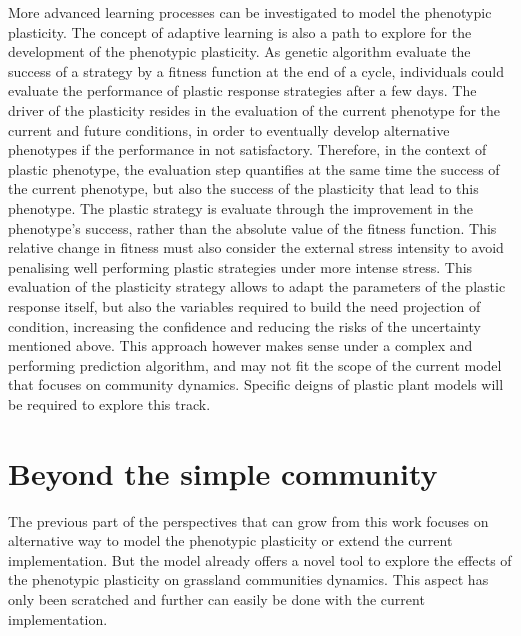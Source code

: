 More advanced learning processes can be investigated to model the phenotypic plasticity. The concept of adaptive learning is also a path to explore for the development of the phenotypic plasticity. As genetic algorithm evaluate the success of a strategy by a fitness function at the end of a cycle, individuals could evaluate the performance of plastic response strategies after a few days. The driver of the plasticity resides in the evaluation of the current phenotype for the current and future conditions, in order to eventually develop alternative phenotypes if the performance in not satisfactory. Therefore, in the context of plastic phenotype, the evaluation step quantifies at the same time the success of the current phenotype, but also the success of the plasticity that lead to this phenotype. The plastic strategy is evaluate through the improvement in the phenotype's success, rather than the absolute value of the fitness function. This relative change in fitness must also consider the external stress intensity to avoid penalising well performing plastic strategies under more intense stress. This evaluation of the plasticity strategy allows to adapt the parameters of the plastic response itself, but also the variables required to build the need projection of condition, increasing the confidence and reducing the risks of the uncertainty mentioned above. This approach however makes sense under a complex and performing prediction algorithm, and may not fit the scope of the current model that focuses on community dynamics. Specific deigns of plastic plant models will be required to explore this track.





\section{Beyond the simple community}

The previous part of the perspectives that can grow from this work focuses on alternative way to model the phenotypic plasticity or extend the current implementation. But the model already offers a novel tool to explore the effects of the phenotypic plasticity on grassland communities dynamics. This aspect has only been scratched and further can easily be done with the current implementation.

